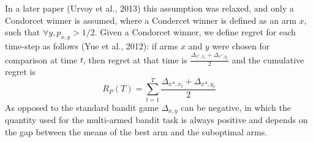 \documentclass{llncs}
\begin{document}
		 In a later paper (Urvoy et al., 2013) this assumption was relaxed, and only a Condorcet winner is assumed, where a Condercet winner is defined as an arm $x$, such that $ \forall y, p_{x,y} > 1/2$. 
		 Given a Condorcet winner, we define regret for each time-step as follows (Yue et al., 2012): if arms $x$ and $y$ were chosen for comparison at time $t$, then regret at that time is $ \frac{\Delta_{x^*,x_t}+\Delta_{x^*,y_t}}{2} $ and the cumulative regret is
		 \begin{equation}\label{eq:preference_regret}
		 R_P(T) = \sum_{t=1}^T \frac{\Delta_{x*,x_t}+\Delta_{x*,y_t}}{2}
		 \end{equation}
		 As opposed to the standard bandit game $\Delta_{x,y}$ can be negative, in which the quantity used for the multi-armed bandit task is always positive and depends on the gap between the means of the best arm and the suboptimal arms.
		 
\end{document}
